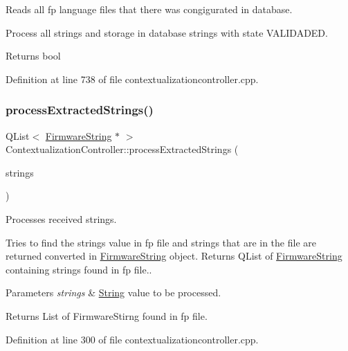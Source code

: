 Reads all fp language files that there was congigurated in database. 

Process all strings and storage in database strings with state V\+A\+L\+I\+D\+A\+D\+ED. \begin{DoxyReturn}{Returns}
bool 
\end{DoxyReturn}


Definition at line 738 of file contextualizationcontroller.\+cpp.

\mbox{\label{classContextualizationController_a97436fb5b350bcc6be500b0fe2ecc1b7}} 
\subsubsection{\texorpdfstring{process\+Extracted\+Strings()}{processExtractedStrings()}}
{\footnotesize\ttfamily Q\+List$<$ \mbox{\hyperlink{classFirmwareString}{Firmware\+String}} $\ast$ $>$ Contextualization\+Controller\+::process\+Extracted\+Strings (\begin{DoxyParamCaption}\item[{Q\+String\+List}]{strings }\end{DoxyParamCaption})\hspace{0.3cm}{\ttfamily [protected]}}



Processes received strings. 

Tries to find the strings value in fp file and strings that are in the file are returned converted in \mbox{\hyperlink{classFirmwareString}{Firmware\+String}} object. Returns Q\+List of \mbox{\hyperlink{classFirmwareString}{Firmware\+String}} containing strings found in fp file.. 
\begin{DoxyParams}{Parameters}
{\em strings} & \mbox{\hyperlink{classString}{String}} value to be processed. \\
\hline
\end{DoxyParams}
\begin{DoxyReturn}{Returns}
List of Firmware\+Stirng found in fp file. 
\end{DoxyReturn}


Definition at line 300 of file contextualizationcontroller.\+cpp.

